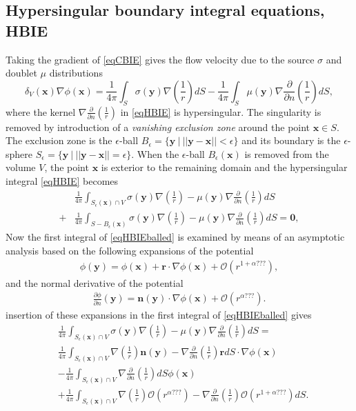 \documentclass[]{book}
\newcommand{\V}[1]{\boldsymbol{#1}}
\newcommand{\nn}{\nonumber}
\newcommand{\D}[2]{\frac{\partial #1}{\partial #2}}
\newcommand{\eballx}{B_{\epsilon}(\V{x})}
\newcommand{\espherex}{S_{\epsilon}(\V{x})}
\begin{document}
\subsection{Hypersingular boundary integral equations, HBIE}
Taking the gradient of \eqref{eqCBIE} gives the flow velocity due to the source $\sigma$ and doublet $\mu$ distributions 
\begin{equation}
\delta_{V}(\V{x})\nabla \phi(\V{x}) = 
 \frac{1}{4 \pi} \int_{S} \sigma (\V{y}) \nabla\left(\frac{1}{r} \right) dS
- \frac{1}{4 \pi} \int_{S} \mu(\V{y}) \nabla \frac{\partial }{\partial n} \left( \frac{1}{r}\right) dS,
\label{eqHBIE}
\end{equation}
where the kernel $\nabla \frac{\partial }{\partial n} \left( \frac{1}{r}\right)$ in \eqref{eqHBIE} is hypersingular. The singularity is removed by introduction of a \emph{vanishing exclusion zone} around the point $\V{x} \in S$. The exclusion zone is the $\epsilon$-ball $B_{\epsilon} = \{ \V{y} ~|~ ||\V{y} - \V{x}||< \epsilon \}$ and its boundary is the $\epsilon$-sphere $S_{\epsilon} = \{ \V{y} ~|~ ||\V{y} - \V{x}||= \epsilon \}$. When the $\epsilon$-ball $B_{\epsilon}(\V{x})$ is removed from the volume $V$, the point $\V{x}$ is exterior to the remaining domain and the hypersingular integral \eqref{eqHBIE} becomes
\begin{align}
&\frac{1}{4 \pi} \int_{\espherex \cap V} \sigma (\V{y}) \nabla\left(\frac{1}{r} \right) - \mu(\V{y}) \nabla \frac{\partial }{\partial n} \left( \frac{1}{r}\right) dS \nn\\
+& \frac{1}{4 \pi} \int_{S - \eballx} \sigma (\V{y}) \nabla\left(\frac{1}{r} \right) - \mu(\V{y}) \nabla \frac{\partial }{\partial n} \left( \frac{1}{r}\right) dS = \V{0},
\label{eqHBIEballed}
\end{align}
Now the first integral of \eqref{eqHBIEballed} is examined by means of an asymptotic analysis based on the following expansions of the potential
\begin{align}
	\phi(\V{y}) = 	\phi(\V{x}) + \V{r} \cdot \nabla \phi(\V{x}) + \mathcal{O}(r^{1+\alpha???}),
\end{align}
and the normal derivative of the potential 
\begin{align}
\D{\phi}{n}(\V{y}) = \V{n}(\V{y}) \cdot \nabla \phi(\V{x}) + \mathcal{O}(r^{\alpha???}).
\end{align}
insertion of these expansions in the first integral of \eqref{eqHBIEballed} gives
\begin{align}
&\frac{1}{4 \pi} \int_{\espherex \cap V} \sigma (\V{y}) \nabla\left(\frac{1}{r} \right) - \mu(\V{y}) \nabla \frac{\partial }{\partial n} \left( \frac{1}{r}\right) dS =\nn\\
&\frac{1}{4 \pi} \int_{\espherex \cap V} \nabla\left(\frac{1}{r} \right)\V{n}(\V{y}) - \nabla \frac{\partial }{\partial n} \left( \frac{1}{r}\right)\V{r} dS \cdot \nabla \phi(\V{x}) \nn\\
&-\frac{1}{4 \pi} \int_{\espherex \cap V}   \nabla \frac{\partial }{\partial n} \left( \frac{1}{r}\right)  dS\phi(\V{x}) \nn\\
&+\frac{1}{4 \pi} \int_{\espherex \cap V} \nabla\left(\frac{1}{r} \right)\mathcal{O}(r^{\alpha???}) - \nabla \frac{\partial }{\partial n} \left( \frac{1}{r}\right) \mathcal{O}(r^{1+\alpha???})  dS.
\end{align}
\end{document}
